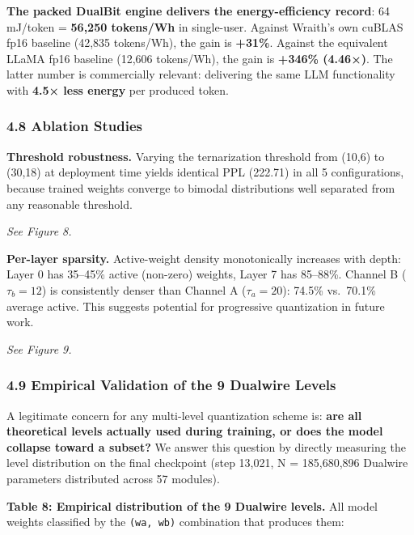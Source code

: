 \textbf{The packed DualBit engine delivers the energy-efficiency
record}: 64 mJ/token = \textbf{56,250 tokens/Wh} in single-user. Against
Wraith's own cuBLAS fp16 baseline (42,835 tokens/Wh), the gain is
\textbf{+31\%}. Against the equivalent LLaMA fp16 baseline (12,606
tokens/Wh), the gain is \textbf{+346\% (4.46×)}. The latter number is
commercially relevant: delivering the same LLM functionality with
\textbf{4.5× less energy} per produced token.

\subsubsection{4.8 Ablation Studies}\label{ablation-studies}

\textbf{Threshold robustness.} Varying the ternarization threshold from
(10,6) to (30,18) at deployment time yields identical PPL (222.71) in
all 5 configurations, because trained weights converge to bimodal
distributions well separated from any reasonable threshold.

\emph{See Figure 8.}

\textbf{Per-layer sparsity.} Active-weight density monotonically
increases with depth: Layer 0 has 35--45\% active (non-zero) weights,
Layer 7 has 85--88\%. Channel B (\(\tau_b=12\)) is consistently denser
than Channel A (\(\tau_a=20\)): 74.5\% vs.~70.1\% average active. This
suggests potential for progressive quantization in future work.

\emph{See Figure 9.}

\subsubsection{4.9 Empirical Validation of the 9 Dualwire
Levels}\label{empirical-validation-of-the-9-dualwire-levels}

A legitimate concern for any multi-level quantization scheme is:
\textbf{are all theoretical levels actually used during training, or
does the model collapse toward a subset?} We answer this question by
directly measuring the level distribution on the final checkpoint (step
13,021, N = 185,680,896 Dualwire parameters distributed across 57
modules).

\textbf{Table 8: Empirical distribution of the 9 Dualwire levels.} All
model weights classified by the \texttt{(wa,\ wb)} combination that
produces them:

